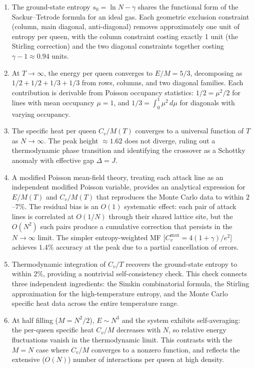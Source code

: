 \documentclass[aps, pre, reprint, amsmath, amssymb, superscriptaddress, floatfix]{revtex4-2}
\begin{document}
\begin{enumerate}
\item The ground-state entropy $s_0 = \ln N - \gamma$ shares the
  functional form of the Sackur--Tetrode formula for an ideal gas.
  Each geometric exclusion constraint (column, main diagonal,
  anti-diagonal) removes approximately one unit of entropy per queen,
  with the column constraint costing exactly 1 unit
  (the Stirling correction) and the two diagonal constraints together
  costing $\gamma - 1 \approx 0.94$ units.

\item At $T \to \infty$, the energy per queen converges to
  $E/M = 5/3$, decomposing as $1/2 + 1/2 + 1/3 + 1/3$ from
  rows, columns, and two diagonal families.  Each contribution is
  derivable from Poisson occupancy statistics: $1/2 = \mu^2/2$ for
  lines with mean occupancy $\mu = 1$, and
  $1/3 = \int_0^1 \mu^2\,d\mu$ for diagonals with varying
  occupancy.

\item The specific heat per queen $C_v/M(T)$ converges to a universal
  function of $T$ as $N \to \infty$.  The peak height $\approx 1.62$
  does not diverge, ruling out a thermodynamic phase transition and
  identifying the crossover as a Schottky anomaly with effective gap
  $\Delta = J$.

\item A modified Poisson mean-field theory, treating each attack line
  as an independent modified Poisson variable, provides an analytical
  expression for $E/M(T)$ and $C_v/M(T)$ that reproduces the Monte
  Carlo data to within $2$--$7\%$.  The residual bias is an $O(1)$
  systematic effect: each pair of attack lines is correlated at
  $O(1/N)$ through their shared lattice site, but the $O(N^2)$ such
  pairs produce a cumulative correction that persists in the
  $N \to \infty$ limit.  The simpler entropy-weighted MF
  [$C_v^{\max} = 4(1+\gamma)/e^2$] achieves $1.4\%$ accuracy at the
  peak due to a partial cancellation of errors.

\item Thermodynamic integration of $C_v/T$ recovers the ground-state
  entropy to within $2\%$, providing a nontrivial self-consistency
  check.  This check connects three independent ingredients:
  the Simkin combinatorial formula, the Stirling approximation for
  the high-temperature entropy, and the Monte Carlo specific heat
  data across the entire temperature range.

\item At half filling ($M = N^2/2$), $E \sim N^3$ and the system
  exhibits self-averaging: the per-queen specific heat $C_v/M$
  decreases with $N$, so relative energy fluctuations vanish in the
  thermodynamic limit.  This contrasts with the $M = N$ case where
  $C_v/M$ converges to a nonzero function, and reflects the
  extensive ($O(N)$) number of interactions per queen at high density.

\end{enumerate}
\end{document}
